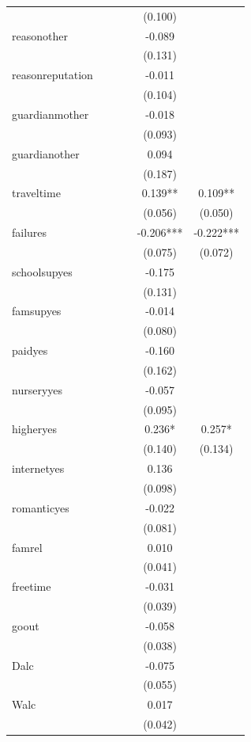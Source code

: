 \documentclass[12pt,english]{article}
\begin{document}
\begin{longtable}[c]{lccccc}
 &  &  &  & (0.100) & \\
reasonother &  &  &  & -0.089 & \\
 &  &  &  & (0.131) \vphantom{1} & \\
reasonreputation &  &  &  & -0.011 & \\
 &  &  &  & (0.104) & \\
guardianmother &  &  &  & -0.018 & \\
 &  &  &  & (0.093) & \\
guardianother &  &  &  & 0.094 & \\
 &  &  &  & (0.187) & \\
traveltime &  &  &  & 0.139** & 0.109**\\
 &  &  &  & (0.056) & (0.050)\\
failures &  &  &  & -0.206*** & -0.222***\\
 &  &  &  & (0.075) & (0.072)\\
schoolsupyes &  &  &  & -0.175 & \\
 &  &  &  & (0.131) & \\
famsupyes &  &  &  & -0.014 & \\
 &  &  &  & (0.080) & \\
paidyes &  &  &  & -0.160 & \\
 &  &  &  & (0.162) & \\
nurseryyes &  &  &  & -0.057 & \\
 &  &  &  & (0.095) & \\
higheryes &  &  &  & 0.236* & 0.257*\\
 &  &  &  & (0.140) & (0.134)\\
internetyes &  &  &  & 0.136 & \\
 &  &  &  & (0.098) & \\
romanticyes &  &  &  & -0.022 & \\
 &  &  &  & (0.081) & \\
famrel &  &  &  & 0.010 & \\
 &  &  &  & (0.041) & \\
freetime &  &  &  & -0.031 & \\
 &  &  &  & (0.039) & \\
goout &  &  &  & -0.058 & \\
 &  &  &  & (0.038) & \\
Dalc &  &  &  & -0.075 & \\
 &  &  &  & (0.055) & \\
Walc &  &  &  & 0.017 & \\
 &  &  &  & (0.042) & \\

\end{longtable}
\end{document}
